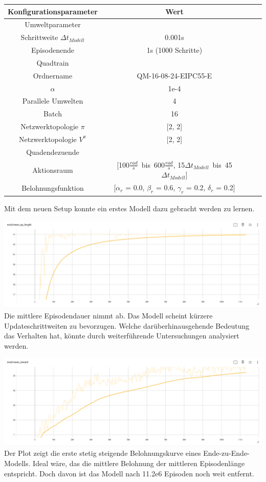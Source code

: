 \begin{center}
\begin{tabular}[h]{|c|c|c|c|}
\hline 
Konfigurationsparameter & Wert \\
\hline 
Umweltparameter & \\
Schrittweite $\Delta t_{Modell}$ & 0.001s \\
Episodenende & 1s (1000 Schritte)\\
\hline
Quadtrain & \\
Ordnername & QM-16-08-24-EIPC55-E\\
$\alpha$ & 1e-4\\
Parallele Umwelten & 4\\
Batch & 16\\
Netzwerktopologie $\pi$ & [2, 2]\\
Netzwerktopologie $V^{\pi}$ & [2, 2]\\
\hline
Quadendezuende & \\
Aktionsraum & [100$\frac{rad}{s}$\ bis\ 600$\frac{rad}{s}$, 15$\Delta t_{Modell}$\ bis\ 45$\Delta t_{Modell}$]\\
Belohnungsfunktion & [$\alpha_r$ = 0.0, $\beta_r$ = 0.6, $\gamma_r$ = 0.2, $\delta_r$ = 0.2]\\
\hline
\end{tabular}
\end{center}
Mit dem neuen Setup konnte ein erstes Modell dazu gebracht werden zu lernen.
\begin{center}
\includegraphics[scale=0.36]{../images/0091 Ende-zu-Ende 1.png}{\\Die mittlere Episodendauer nimmt ab. Das Modell scheint kürzere Updateschrittweiten zu bevorzugen. Welche darüberhinausgehende Bedeutung das Verhalten hat, könnte durch weiterführende Untersuchungen analysiert werden.}
\end{center}
\begin{center}
\includegraphics[scale=0.36]{../images/0092 Ende-zu-Ende 2.png}{\\Der Plot zeigt die erste stetig steigende Belohnungskurve eines Ende-zu-Ende-Modells. Ideal wäre, das die mittlere Belohnung der mittleren Episodenlänge entspricht. Doch davon ist das Modell nach 11.2e6 Episoden noch weit entfernt.}
\end{center}

